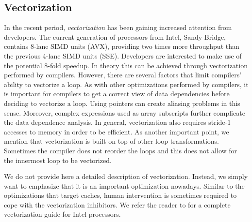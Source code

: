 \subsection{Vectorization}

In the recent period, \textit{vectorization} has been gaining increased
attention from developers. The current generation of processors from Intel,
Sandy Bridge, contains 8-lane SIMD units (AVX), providing two times more
throughput than the previous 4-lane SIMD units (SSE). Developers are interested
to make use of the potential 8-fold speedup. In theory this can be achieved
through vectorization performed by compilers. However, there are several factors
that limit compilers' ability to vectorize a loop. As with other optimizations
performed by compilers, it is important for compilers to get a correct view of
data dependencies before deciding to vectorize a loop. Using pointers can create
aliasing problems in this sense. Moreover, complex expressions used as array
subscripts further complicate the data dependence analysis. In general,
vectorization also requires stride-1 accesses to memory in order to be
efficient. As another important point, we mention that vectorization is built on
top of other loop transformations. Sometimes the compiler does not reorder the
loops and this does not allow for the innermost loop to be vectorized.

We do not provide here a detailed description of vectorization. Instead, we
simply want to emphasize that it is an important optimization nowadays. Similar
to the optimizations that target caches, human intervention is sometimes
required to cope with the vectorization inhibitors. We refer the reader to
\cite{vec_guide} for a complete vectorization guide for Intel processors.

